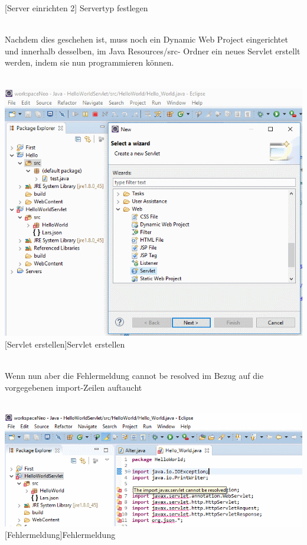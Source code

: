 \documentclass[12pt,a4paper,bibliography=totocnumbered,listof=totocnumbered]{scrartcl}
\begin{document}
\begin{minipage}{\linewidth}
\begin{minipage}{\linewidth}
	[Server einrichten 2]	{Servertyp festlegen}
	\label{fig:eclipse2}
\end{minipage}
\\

Nachdem dies geschehen ist, muss noch ein Dynamic Web Project eingerichtet und innerhalb desselben, im \glqq Java Resources/src\grqq-  Ordner ein neues Servlet erstellt werden, indem sie nun programmieren können.
\\
\\
\vspace{1em}
\begin{minipage}{\linewidth}
	\centering
	\includegraphics[width=0.7\linewidth]{Bilder/Eclipse-ServerErstellen2.png}
	[Servlet erstellen]{Servlet erstellen}	
	\label{fig:eclipse3}
\end{minipage}
\\

Wenn nun aber die Fehlermeldung  \glqq cannot be resolved\grqq{} im Bezug auf die vorgegebenen import-Zeilen auftaucht \\
\\
\vspace{1em}
\begin{minipage}{\linewidth}
	\centering
	\includegraphics[width=0.9\linewidth]{Bilder/Eclipse-ServerErstellen3.png}
	[Fehlermeldung]{Fehlermeldung}	
	\label{fig:eclipse4}
\end{minipage}
\\


\end{minipage}
\end{document}
